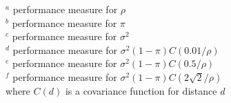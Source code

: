 \documentclass[12pt, titlepage]{article}
\begin{document}
\begin{table}[h]
\begin{center}
\begin{tabular}{c|rr|rr|rr|rr|rr}
   \hline
	\hline
\end{tabular}
\end{center}
$^a$ performance measure for $\rho$ \\
$^b$ performance measure for $\pi$ \\
$^c$ performance measure for $\sigma^2$ \\
$^d$ performance measure for $\sigma^2(1-\pi)C(0.01/\rho)$ \\
$^e$ performance measure for $\sigma^2(1-\pi)C(0.5/\rho)$ \\
$^f$ performance measure for $\sigma^2(1-\pi)C(2\sqrt{2}/\rho)$ \\
where $C(d)$ is a covariance function for distance $d$ \\
\end{table}

\end{document}
